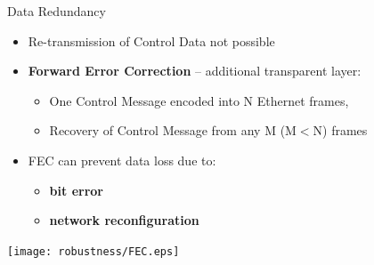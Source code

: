 \documentclass[compress,red]{beamer}
\begin{document}
\begin{frame}{Data Redundancy}

  \begin{itemize}
    \item Re-transmission of Control Data not possible
	\item {\bf Forward Error Correction}  -- additional transparent layer:
	\begin{itemize}
		\item One Control Message encoded into N Ethernet frames,
		\item Recovery of Control Message from any M (M$<$N) frames
	\end{itemize}
	\item FEC can prevent data loss due to:
	\begin{itemize}	
		\item {\bf bit error} 
		\item {\bf network reconfiguration}
	\end{itemize}	
  \end{itemize}
  
  	\begin{center}
      \texttt{[image: robustness/FEC.eps]}
    \end{center}
  
\end{frame}
\end{document}
